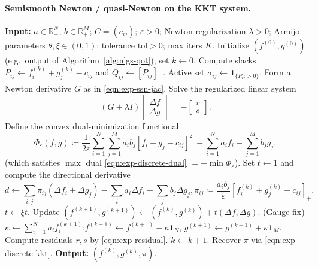 \documentclass{article}
\theoremstyle{plain}
\theoremstyle{definition}
\theoremstyle{remark}
\numberwithin{equation}{section}
\newcommand{\R}{\mathbb{R}}
\begin{document}
\paragraph{Semismooth Newton / quasi-Newton on the KKT system.}
\begin{algorithm}[ht]
\caption{Globalized, regularized semismooth Newton for discrete QOT (cf.\ \citep[Alg.~2]{lorenz2021quadratically})}\label{alg:ssn-qot}
\begin{algorithmic}[1]
\STATE \textbf{Input:} $a\in\R_+^N$, $b\in\R_+^M$; $C=(c_{ij})$; $\varepsilon>0$; Newton regularization $\lambda>0$;
Armijo parameters $\theta,\xi\in(0,1)$; tolerance $\mathrm{tol}>0$; max iters $K$.
\STATE Initialize $(f^{(0)},g^{(0)})$ (e.g.\ output of Algorithm~\ref{alg:nlgs-qot}); set $k\gets0$.
\REPEAT
\STATE Compute slacks $P_{ij}\gets f_i^{(k)}+g_j^{(k)}-c_{ij}$ and $Q_{ij}\gets[P_{ij}]_+$.
\STATE Active set $\sigma_{ij}\gets\mathbf1_{\{P_{ij}>0\}}$.
\STATE Form a Newton derivative $G$ as in \eqref{eqn:exp-ssn-jac}.
\STATE Solve the regularized linear system
$$
(G+\lambda I)\begin{bmatrix}\Delta f\\ \Delta g\end{bmatrix}=-\begin{bmatrix}r\\ s\end{bmatrix}.
$$
\STATE Define the convex dual-minimization functional
$$
\Phi_\varepsilon(f,g)\coloneqq\frac{1}{2\varepsilon}\sum_{i=1}^N\sum_{j=1}^M a_ib_j[f_i+g_j-c_{ij}]_+^2-\sum_{i=1}^N a_if_i-\sum_{j=1}^Mb_j g_j,
$$
(which satisfies $\max$ dual \eqref{eqn:exp-discrete-dual} $=-\min\Phi_\varepsilon$).
\STATE Set $t\gets1$ and compute the directional derivative
$$
d\gets\sum_{i,j}\pi_{ij}(\Delta f_i+\Delta g_j)-\sum_ia_i\Delta f_i-\sum_jb_j\Delta g_j,\pi_{ij}\coloneqq\frac{a_ib_j}{\varepsilon}[f_i^{(k)}+g_j^{(k)}-c_{ij}]_+.
$$
\STATE $t\gets\xi t$.
\ENDWHILE
\STATE Update $(f^{(k+1)},g^{(k+1)})\gets(f^{(k)},g^{(k)})+t(\Delta f,\Delta g)$.
\STATE (Gauge-fix) $\kappa\gets\sum_{i=1}^N a_i f_i^{(k+1)}$;$f^{(k+1)}\gets f^{(k+1)}-\kappa\mathbf1_N$, $g^{(k+1)}\gets g^{(k+1)}+\kappa\mathbf1_M$.
\STATE Compute residuals $r,s$ by \eqref{eqn:exp-residual}.
\STATE $k\gets k+1$.
\STATE Recover $\pi$ via \eqref{eqn:exp-discrete-kkt}.
\STATE \textbf{Output:} $(f^{(k)},g^{(k)},\pi)$.
\end{algorithmic}
\end{algorithm}
\end{document}
